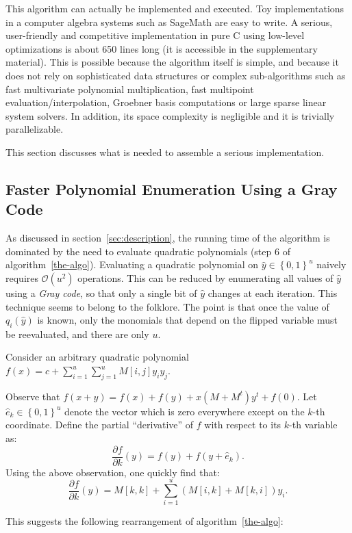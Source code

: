 \documentclass[a4paper,UKenglish,cleveref, autoref]{lipics-v2019}
\newcommand{\bits}{\left\{0, 1\right\}}
\newcommand{\bigO}[1]{\ensuremath{\mathcal{O}\left( #1 \right)} }
\begin{document}
  This algorithm can actually be implemented and executed. Toy implementations in
  a computer algebra systems such as \textsf{SageMath} are easy to write. A
  serious, user-friendly and competitive implementation in pure C using low-level
  optimizations is about 650 lines long (it is accessible in the supplementary
  material). This is possible because the algorithm itself is simple, and because
  it does not rely on sophisticated data structures or complex sub-algorithms such
  as fast multivariate polynomial multiplication, fast multipoint
  evaluation/interpolation, Groebner basis computations or large sparse linear
  system solvers. In addition, its space complexity is negligible and it is
  trivially parallelizable.
  
  This section discusses what is needed to assemble a serious implementation.
  
  \subsection{Faster Polynomial Enumeration Using a Gray Code}
  \label{sec:gray}
  
  As discussed in section~\ref{sec:description}, the running time of the algorithm
  is dominated by the need to evaluate quadratic polynomials (step 6 of
  algorithm~\ref{the-algo}). Evaluating a quadratic polynomial on
  $\hat y \in \bits^u$ naively requires $\bigO{u^2}$ operations. This can be
  reduced by enumerating all values of $\hat y$ using a \emph{Gray code}, so that only a
  single bit of $\hat y$ changes at each iteration. This technique seems to belong
  to the folklore. The point is that once the value of $q_i(\hat y)$ is known,
  only the monomials that depend on the flipped variable must be reevaluated, and
  there are only $u$.
  
  Consider an arbitrary quadratic polynomial $\displaystyle f(x) = c + \sum_{i=1}^u \sum_{j=1}^u M[i,j] y_i y_j$.
  
  Observe that $f(x + y) = f(x) + f(y) + x \left(M + M^t\right)y^t + f(0)$. Let
  $\hat e_k \in \bits^u$ denote the vector which is zero everywhere except on the
  $k$-th coordinate.  Define the partial ``derivative'' of $f$ with respect to its
  $k$-th variable as:
  \[
  \frac{\partial f}{\partial k}(y) = f(y) + f(y + \hat e_k).
  \]
  Using the above observation, one quickly find that:
  \[
  \frac{\partial f}{\partial k}(y) = M[k,k] + \sum_{i=1}^u (M[i,k] + M[k, i]) y_i.
  \]
  
  This suggests the following rearrangement of algorithm~\ref{the-algo}:
  
\end{document}
